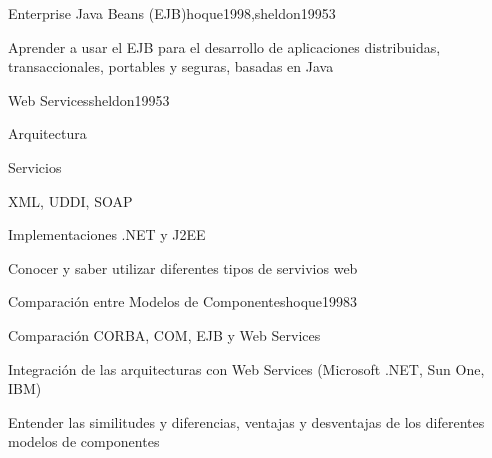 \begin{syllabus}
\begin{unit}{Enterprise Java Beans (EJB)}{hoque1998,sheldon1995}{3}
   \begin{learningoutcomes}
      \item Aprender a usar el EJB para el desarrollo de aplicaciones distribuidas, transaccionales, portables y seguras, basadas en Java
   \end{learningoutcomes}
\end{unit}

\begin{unit}{Web Services}{sheldon1995}{3}
   \begin{topics}
      \item Arquitectura
      \item Servicios
      \item XML, UDDI, SOAP
      \item Implementaciones .NET y J2EE
   \end{topics}

   \begin{learningoutcomes}
      \item Conocer y saber utilizar diferentes tipos de servivios web
   \end{learningoutcomes}
\end{unit}

\begin{unit}{Comparación entre Modelos de Componentes}{hoque1998}{3}
   \begin{topics}
      \item Comparación CORBA, COM, EJB y Web Services
      \item Integración de las arquitecturas con Web Services (Microsoft .NET, Sun One, IBM)
   \end{topics}

   \begin{learningoutcomes}
      \item Entender las similitudes y diferencias, ventajas y desventajas de los diferentes modelos de componentes
   \end{learningoutcomes}
\end{unit}

\begin{coursebibliography}
\end{coursebibliography}
\end{syllabus}
